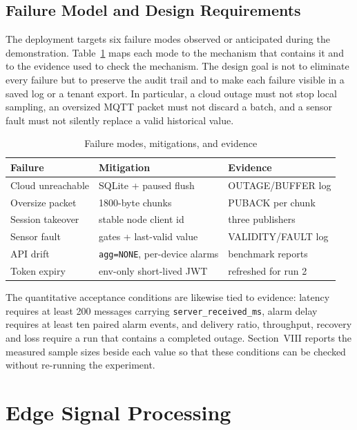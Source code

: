 \documentclass[conference]{IEEEtran}
\begin{document}
\subsection{Failure Model and Design Requirements}
\label{sec:failure-model}

The deployment targets six failure modes observed or anticipated during the
demonstration. Table~\ref{tab:failures} maps each mode to the mechanism that
contains it and to the evidence used to check the mechanism. The design goal is
not to eliminate every failure but to preserve the audit trail and to make each
failure visible in a saved log or a tenant export. In particular, a cloud
outage must not stop local sampling, an oversized MQTT packet must not discard a
batch, and a sensor fault must not silently replace a valid historical value.

\begin{table}[t]
\caption{Failure modes, mitigations, and evidence}
\label{tab:failures}
\centering
\scriptsize
\begin{tabular}{@{}lll@{}}
\toprule
Failure & Mitigation & Evidence \\
\midrule
Cloud unreachable & SQLite + paused flush & OUTAGE/BUFFER log \\
Oversize packet & 1800-byte chunks & PUBACK per chunk \\
Session takeover & stable node client id & three publishers \\
Sensor fault & gates + last-valid value & VALIDITY/FAULT log \\
API drift & \texttt{agg=NONE}, per-device alarms & benchmark reports \\
Token expiry & env-only short-lived JWT & refreshed for run 2 \\
\bottomrule
\end{tabular}
\end{table}

The quantitative acceptance conditions are likewise tied to evidence: latency
requires at least 200 messages carrying \texttt{server\_received\_ms}, alarm delay
requires at least ten paired alarm events, and delivery ratio, throughput,
recovery and loss require a run that contains a completed outage. Section~VIII
reports the measured sample sizes beside each value so that these conditions can
be checked without re-running the experiment.

\section{Edge Signal Processing}
\label{sec:edge-dsp}
\end{document}
